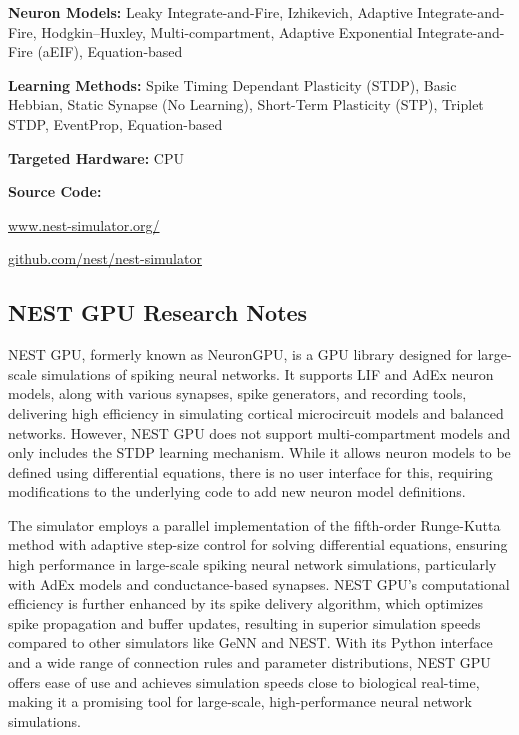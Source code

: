 \begin{tcolorbox}[enhanced,attach boxed title to top center={yshift=-3mm,yshifttext=-1mm}, colback=blue!5!white,colframe=blue!75!black,colbacktitle=red!80!black, title=NEST at a Glance,fonttitle=\bfseries, boxed title style={size=small,colframe=red!50!black} ]

\textbf{Neuron Models:} Leaky Integrate-and-Fire, Izhikevich, Adaptive Integrate-and-Fire, Hodgkin–Huxley, Multi-compartment, Adaptive Exponential  Integrate-and-Fire (aEIF), Equation-based

\textbf{Learning Methods:} Spike Timing Dependant Plasticity (STDP), Basic Hebbian, Static Synapse (No Learning), Short-Term Plasticity (STP), Triplet STDP, EventProp, Equation-based  

\textbf{Targeted Hardware:} CPU 

\textbf{Source Code:} 

\href{https://www.nest-simulator.org/}{www.nest-simulator.org/}

\href{https://github.com/nest/nest-simulator}{github.com/nest/nest-simulator}
\end{tcolorbox}
\subsection*{NEST GPU Research Notes}\label{NEST GPU}

NEST GPU, formerly known as NeuronGPU, is a GPU library designed for large-scale simulations of spiking neural networks. It supports LIF and AdEx neuron models, along with various synapses, spike generators, and recording tools, delivering high efficiency in simulating cortical microcircuit models and balanced networks. However, NEST GPU does not support multi-compartment models and only includes the STDP learning mechanism. While it allows neuron models to be defined using differential equations, there is no user interface for this, requiring modifications to the underlying code to add new neuron model definitions.

The simulator employs a parallel implementation of the fifth-order Runge-Kutta method with adaptive step-size control for solving differential equations, ensuring high performance in large-scale spiking neural network simulations, particularly with AdEx models and conductance-based synapses. NEST GPU's computational efficiency is further enhanced by its spike delivery algorithm, which optimizes spike propagation and buffer updates, resulting in superior simulation speeds compared to other simulators like GeNN and NEST. With its Python interface and a wide range of connection rules and parameter distributions, NEST GPU offers ease of use and achieves simulation speeds close to biological real-time, making it a promising tool for large-scale, high-performance neural network simulations.


